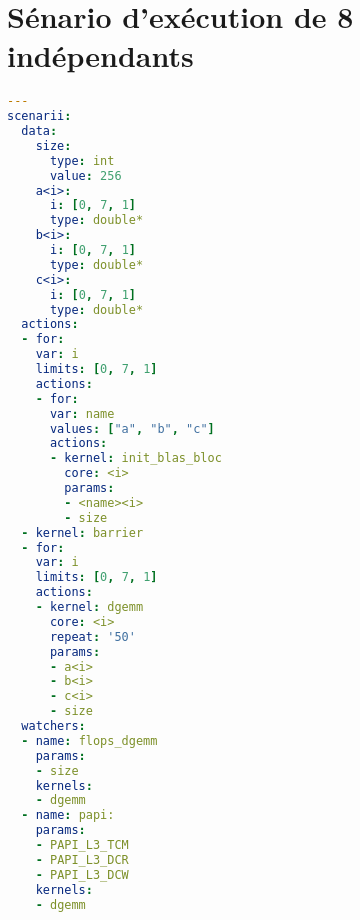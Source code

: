 \section{Sénario d'exécution de 8 \gemm indépendants}\label{chap:annexe:tool:dgemm}

\begin{lstlisting}[language=yaml,caption=Scénario de calcul de 8 gemm indépendants,label=lst:annexe:tool:dgemm,multicols=2,xleftmargin=3em]
---
scenarii:
  data:
    size:
      type: int
      value: 256
    a<i>:
      i: [0, 7, 1]
      type: double*
    b<i>:
      i: [0, 7, 1]
      type: double*
    c<i>:
      i: [0, 7, 1]
      type: double*
  actions:
  - for:
    var: i
    limits: [0, 7, 1]
    actions:
    - for:
      var: name
      values: ["a", "b", "c"]
      actions:
      - kernel: init_blas_bloc
        core: <i>
        params:
        - <name><i>
        - size
  - kernel: barrier
  - for:
    var: i
    limits: [0, 7, 1]
    actions:
    - kernel: dgemm
      core: <i>
      repeat: '50'
      params:
      - a<i>
      - b<i>
      - c<i>
      - size
  watchers:
  - name: flops_dgemm
    params:
    - size
    kernels:
    - dgemm
  - name: papi:
    params:
    - PAPI_L3_TCM
    - PAPI_L3_DCR
    - PAPI_L3_DCW
    kernels:
    - dgemm
\end{lstlisting}
